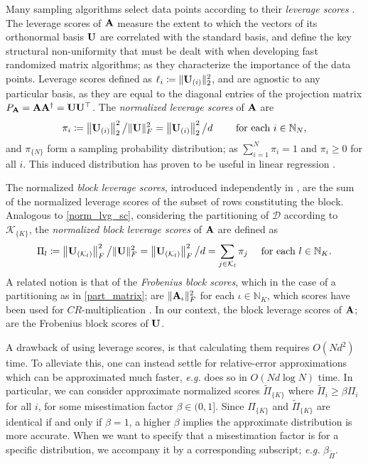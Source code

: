 \documentclass[journal,letterpaper,onecolumn,twoside,nofonttune]{IEEEtran}
\newcommand{\N}{\mathbb{N}}
\newcommand{\D}{\mathcal{D}}
\newcommand{\K}{\mathcal{K}}
\newcommand{\Ub}{\bold{U}}
\newcommand{\Ab}{\bold{A}}
\newcommand{\Pit}{\tilde{\Pi}}
\begin{document}
Many sampling algorithms select data points according to their \textit{leverage scores} \cite{MMY15,DMMW12}. The leverage scores of $\Ab$ measure the extent to which the vectors of its orthonormal basis $\Ub$ are correlated with the standard basis, and define the key structural non-uniformity that must be dealt with when developing fast randomized matrix algorithms; as they characterize the importance of the data points. Leverage scores defined as $\ell_i\coloneqq\|\Ub_{(i)}\|_2^2$, and are agnostic to any particular basis, as they are equal to the diagonal entries of the projection matrix $P_\Ab=\Ab\Ab^{\dagger}=\Ub\Ub^\top$. The \textit{normalized leverage scores} of $\Ab$ are
\begin{equation}
\label{norm_lvg_sc}
  \pi_i \coloneqq \left\|\Ub_{(i)}\right\|_2^2\big/\|\Ub\|_F^2 = \left\|\Ub_{(i)}\right\|_2^2\big/d \qquad \text{ for each } i\in\N_N,
\end{equation}
and $\pi_{\{N\}}$ form a sampling probability distribution; as $\sum_{i=1}^N\pi_i=1$ and $\pi_i\geqslant0$ for all $i$. This induced distribution has proven to be useful in linear regression \cite{DMMW12,Woo14,Mah16,ERNM22}.

The normalized \textit{block leverage scores}, introduced independently in \cite{CPH20a,OJXE18}, are the sum of the normalized leverage scores of the subset of rows constituting the block. Analogous to \eqref{norm_lvg_sc}, considering the partitioning of $\D$ according to $\K_{\{K\}}$, the \textit{normalized block leverage scores} of $\Ab$ are defined as
\begin{equation}
\label{norm_block_lvg_sc}
  \Pi_l \coloneqq \left\|\Ub_{(\K_l)}\right\|_F^2\big/\|\Ub\|_F^2 = \left\|\Ub_{(\K_l)}\right\|_F^2\big/d = \sum_{j\in\K_l}\pi_j \quad \text{ for each } l\in\N_K.
\end{equation}
A related notion is that of the \textit{Frobenius block scores}, which in the case of a partitioning as in \eqref{part_matrix}; are $\|\Ab_\iota\|_F^2$ for each $\iota\in\N_K$, which scores have been used for $CR$-multiplication \cite{DKM06a,DKM06b}. In our context, the block leverage scores of $\Ab$; are the Frobenius block scores of $\Ub$.

A drawback of using leverage scores, is that calculating them requires $O(Nd^2)$ time. To alleviate this, one can instead settle for relative-error approximations which can be approximated much faster, \textit{e.g.} \cite{DMMW12} does so in $O(Nd\log N)$ time. In particular, we can consider approximate normalized scores $\Pit_{\{K\}}$ where $\Pit_i\geqslant \beta\Pi_i$ for all $i$, for some misestimation factor $\beta\in(0,1]$. Since $\Pi_{\{K\}}$ and $\Pit_{\{K\}}$ are identical if and only if $\beta=1$, a higher $\beta$ implies the approximate distribution is more accurate. When we want to specify that a misestimation factor is for a specific distribution, we accompany it by a corresponding subscript; \textit{e.g.} $\beta_{\Pit}$.
\end{document}
